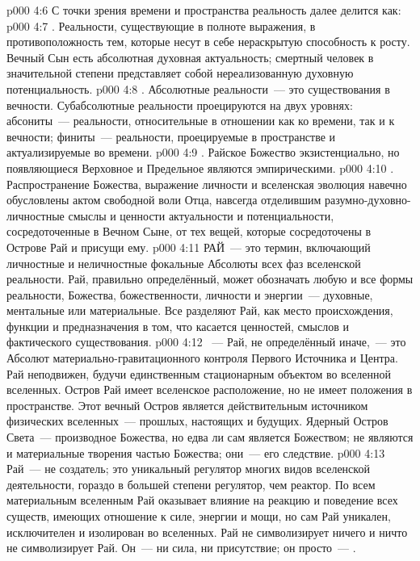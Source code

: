 \vs p000 4:6 \pc С точки зрения времени и пространства реальность далее делится как:
\vs p000 4:7 . Реальности, существующие в полноте выражения, в противоположность тем, которые несут в себе нераскрытую способность к росту. Вечный Сын есть абсолютная духовная актуальность; смертный человек в значительной степени представляет собой нереализованную духовную потенциальность.
\vs p000 4:8 . Абсолютные реальности~--- это существования в вечности. Субабсолютные реальности проецируются на двух уровнях: абсониты~--- реальности, относительные в отношении как ко времени, так и к вечности; финиты~--- реальности, проецируемые в пространстве и актуализируемые во времени.
\vs p000 4:9 . Райское Божество экзистенциально, но появляющиеся Верховное и Предельное являются эмпирическими.
\vs p000 4:10 . Распространение Божества, выражение личности и вселенская эволюция навечно обусловлены актом свободной воли Отца, навсегда отделившим разумно\hyp{}духовно\hyp{}личностные смыслы и ценности актуальности и потенциальности, сосредоточенные в Вечном Сыне, от тех вещей, которые сосредоточены в Острове Рай и присущи ему.
\vs p000 4:11 \pc РАЙ~--- это термин, включающий личностные и неличностные фокальные Абсолюты всех фаз вселенской реальности. Рай, правильно определённый, может обозначать любую и все формы реальности, Божества, божественности, личности и энергии~--- духовные, ментальные или материальные. Все разделяют Рай, как место происхождения, функции и предназначения в том, что касается ценностей, смыслов и фактического существования.
\vs p000 4:12 \pc {}~--- Рай, не определённый иначе,~--- это Абсолют материально\hyp{}гравитационного контроля Первого Источника и Центра. Рай неподвижен, будучи единственным стационарным объектом во вселенной вселенных. Остров Рай имеет вселенское расположение, но не имеет положения в пространстве. Этот вечный Остров является действительным источником физических вселенных~--- прошлых, настоящих и будущих. Ядерный Остров Света~--- производное Божества, но едва ли сам является Божеством; не являются и материальные творения частью Божества; они~--- его следствие.
\vs p000 4:13 Рай~--- не создатель; это уникальный регулятор многих видов вселенской деятельности, гораздо в большей степени регулятор, чем реактор. По всем материальным вселенным Рай оказывает влияние на реакцию и поведение всех существ, имеющих отношение к силе, энергии и мощи, но сам Рай уникален, исключителен и изолирован во вселенных. Рай не символизирует ничего и ничто не символизирует Рай. Он~--- ни сила, ни присутствие; он просто~--- .
